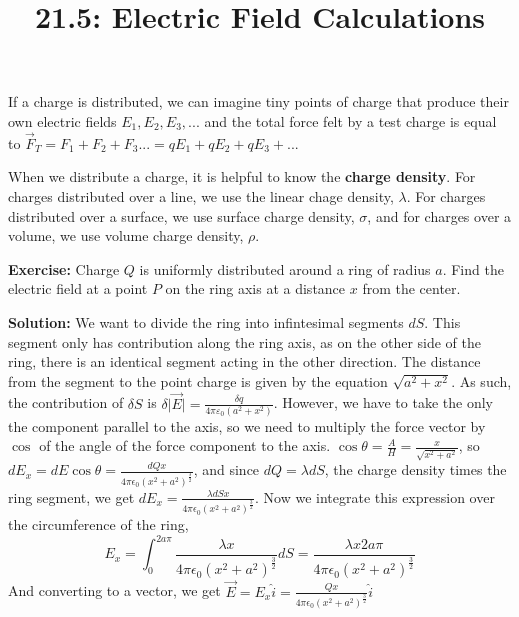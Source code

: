 \documentclass{article}
\title{21.5: Electric Field Calculations}
\begin{document}
\maketitle

\begin{theorem}
If a charge is distributed, we can imagine tiny points of charge that produce their own electric fields $E_1, E_2, E_3, ...$ and the total force felt by a test charge is equal to $\vec{F}_T = F_1 + F_2 + F_3 ... = qE_1 + qE_2 + qE_3 + ...$
\end{theorem}

\begin{definition}
When we distribute a charge, it is helpful to know the \textbf{charge density}. For charges distributed over a line, we use the linear chage density, $\lambda$. For charges distributed over a surface, we use surface charge density, $\sigma$, and for charges over a volume, we use volume charge density, $\rho$.   
\end{definition}

\textbf{Exercise:} Charge $Q$ is uniformly distributed around a ring of radius $a$. Find the electric field at a point $P$ on the ring axis at a distance $x$ from the center.

\textbf{Solution:} We want to divide the ring into infintesimal segments $dS$. This segment only has contribution along the ring axis, as on the other side of the ring, there is an identical segment acting in the other direction. The distance from the segment to the point charge is given by the equation $\sqrt{a^2 + x^2}$. As such, the contribution of $\delta S$ is  $\delta \vert \vec{E} \vert = \frac{\delta q}{4 \pi \varepsilon_0 (a^2 + x^2)}$. However, we have to take the only the component parallel to the axis, so we need to multiply the force vector by $\cos$ of the angle of the force component to the axis. $\cos \theta = \frac{A}{H} = \frac{x}{\sqrt{x^2 + a^2}}$, so $dE_x = dE\cos \theta = \frac{dQ x}{4\pi\epsilon_0 (x^2 + a^2)^{\frac{3}{2}}}$, and since $dQ = \lambda dS$, the charge density times the ring segment, we get $dE_x = \frac{\lambda dSx}{4\pi\epsilon_0 (x^2 + a^2)^{\frac{3}{2}}}$. Now we integrate this expression over the circumference of the ring, $$E_x = \int_0^{2a\pi}\frac{\lambda x}{4\pi\epsilon_0(x^2+a^2)^{\frac{3}{2}}}dS = \frac{\lambda x 2a\pi}{4\pi\epsilon_0 (x^2+a^2)^\frac{3}{2}}$$And converting to a vector, we get $\vec{E} = E_x\hat{i} = \frac{Qx}{4\pi\epsilon_0(x^2+a^2)^\frac{3}{2}}\hat{i}$
\end{document}
